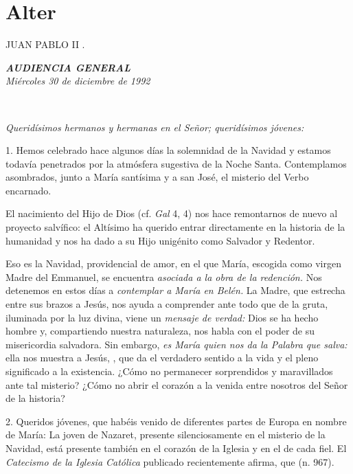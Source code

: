 \section{Alter} JUAN PABLO II .

\emph{\textbf{AUDIENCIA GENERAL}}\\[2\baselineskip]\emph{Miércoles 30 de diciembre de 1992}

~

\emph{Queridísimos hermanos y hermanas en el Señor; queridísimos jóvenes:}

1. Hemos celebrado hace algunos días la solemnidad de la Navidad y estamos todavía penetrados por la atmósfera sugestiva de la Noche Santa. Contemplamos asombrados, junto a María santísima y a san José, el misterio del Verbo encarnado.

El nacimiento del Hijo de Dios  (cf. \emph{Gal} 4, 4) nos hace remontarnos de nuevo al proyecto salvífico: el Altísimo ha querido entrar directamente en la historia de la humanidad y nos ha dado a su Hijo unigénito como Salvador y Redentor.

Eso es la Navidad,  providencial de amor, en el que María, escogida como virgen Madre del Emmanuel, se encuentra \emph{asociada a la obra de la redención.} Nos detenemos en estos días a \emph{contemplar a María en Belén.} La Madre, que estrecha entre sus brazos a Jesús, nos ayuda a comprender ante todo que de la gruta, iluminada por la luz divina, viene un \emph{mensaje de verdad:} Dios se ha hecho hombre y, compartiendo nuestra naturaleza, nos habla con el poder de su misericordia salvadora. Sin embargo, \emph{es María quien nos da la Palabra que salva:} ella nos muestra a Jesús, , que da el verdadero sentido a la vida y el pleno significado a la existencia. ¿Cómo no permanecer sorprendidos y maravillados ante tal misterio? ¿Cómo no abrir el corazón a la venida entre nosotros del Señor de la historia?

2. Queridos jóvenes, que habéis venido de diferentes partes de Europa en nombre de María: La joven de Nazaret, presente silenciosamente en el misterio de la Navidad, está presente también en el corazón de la Iglesia y en el de cada fiel. El \emph{Catecismo de la Iglesia Católica} publicado recientemente afirma, que  (n. 967).

